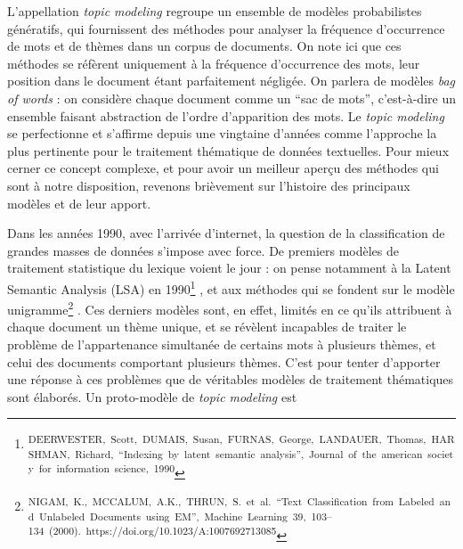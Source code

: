 \documentclass[letterpaper,portrait,12pt]{article}
\begin{document}
\textbf{	}L'appellation \emph{topic modeling }regroupe un ensemble de mod\`{e}les probabilistes g\'{e}n\'{e}ratifs, qui fournissent des m\'{e}thodes pour analyser la fr\'{e}quence d'occurrence de mots et de th\`{e}mes dans un corpus de documents. On note ici que ces m\'{e}thodes se r\'{e}f\`{e}rent uniquement \`{a} la fr\'{e}quence d'occurrence des mots, leur position dans le document \'{e}tant parfaitement n\'{e}glig\'{e}e. On parlera de mod\`{e}les \emph{bag of words} : on consid\`{e}re chaque document comme un {``}sac de mots'', c'est-\`{a}-dire un ensemble faisant abstraction de l'ordre d'apparition des mots. Le \emph{topic modeling} se perfectionne et s'affirme depuis une vingtaine d'ann\'{e}es comme l'approche la plus pertinente pour le traitement th\'{e}matique de donn\'{e}es textuelles. Pour mieux cerner ce concept complexe, et pour avoir un meilleur aper\c{c}u des m\'{e}thodes qui sont \`{a} notre disposition, revenons bri\`{e}vement sur l'histoire des principaux mod\`{e}les et de leur apport.





Dans les ann\'{e}es 1990, avec l'arriv\'{e}e d'internet, la question de la classification de grandes masses de donn\'{e}es s'impose avec force. De premiers mod\`{e}les de traitement statistique du lexique voient le jour : on pense notamment \`{a} la Latent Semantic Analysis (LSA) en 1990\footnote{\textsuperscript{\newpage
}\textsuperscript{	DEERWESTER,\ Scott,\ DUMAIS,\ Susan,\ FURNAS,\ George,\ LANDAUER,\ Thomas,\ HARSHMAN,\ Richard,\ {``}Indexing\ by\ latent\ semantic\ analysis'',\ Journal\ of\ the\ american\ society\ for\ information\ science,\ 1990}} , et aux m\'{e}thodes qui se fondent sur le mod\`{e}le unigramme\footnote{\textsuperscript{\newpage
}\textsuperscript{	NIGAM,\ K.,\ MCCALUM,\ A.K.,\ THRUN,\ S.\ et\ al.\ {``}Text\ Classification\ from\ Labeled\ and\ Unlabeled\ Documents\ using\ EM'',\ Machine\ Learning\ 39,\ 103--134\ (2000).\ https://doi.org/10.1023/A:1007692713085}} . Ces derniers mod\`{e}les sont, en effet, limit\'{e}s en ce qu'ils attribuent \`{a} chaque document un th\`{e}me unique, et se r\'{e}v\`{e}lent incapables de traiter le probl\`{e}me de l'appartenance simultan\'{e}e de certains mots \`{a} plusieurs th\`{e}mes, et celui des documents comportant plusieurs th\`{e}mes. C'est pour tenter d'apporter une r\'{e}ponse \`{a} ces probl\`{e}mes que de v\'{e}ritables mod\`{e}les de traitement th\'{e}matiques sont \'{e}labor\'{e}s. Un proto-mod\`{e}le de \emph{topic modeling} est 
\end{document}

